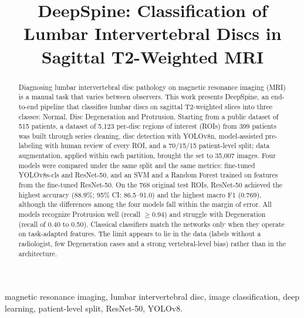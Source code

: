 \documentclass[conference,letterpaper]{IEEEtran}
\begin{document}
\title{DeepSpine: Classification of Lumbar Intervertebral Discs in Sagittal T2-Weighted MRI}

\author{
}

\maketitle

\begin{abstract}
Diagnosing lumbar intervertebral disc pathology on magnetic resonance imaging (MRI) is a manual task that varies between observers. This work presents DeepSpine, an end-to-end pipeline that classifies lumbar discs on sagittal T2-weighted slices into three classes: Normal, Disc Degeneration and Protrusion. Starting from a public dataset of 515 patients, a dataset of 5,123 per-disc regions of interest (ROIs) from 399 patients was built through series cleaning, disc detection with YOLOv8n, model-assisted pre-labeling with human review of every ROI, and a 70/15/15 patient-level split; data augmentation, applied within each partition, brought the set to 35,007 images. Four models were compared under the same split and the same metrics: fine-tuned YOLOv8s-cls and ResNet-50, and an SVM and a Random Forest trained on features from the fine-tuned ResNet-50. On the 768 original test ROIs, ResNet-50 achieved the highest accuracy (88.9\%; 95\% CI: 86.5--91.0) and the highest macro F1 (0.769), although the differences among the four models fall within the margin of error. All models recognize Protrusion well (recall $\geq 0.94$) and struggle with Degeneration (recall of 0.40 to 0.50). Classical classifiers match the networks only when they operate on task-adapted features. The limit appears to lie in the data (labels without a radiologist, few Degeneration cases and a strong vertebral-level bias) rather than in the architecture.
\end{abstract}

\begin{IEEEkeywords}
magnetic resonance imaging, lumbar intervertebral disc, image classification, deep learning, patient-level split, ResNet-50, YOLOv8.
\end{IEEEkeywords}
\end{document}
